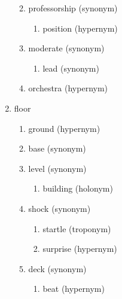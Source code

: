 \documentclass[11pt,a4paper,twocolumn]{article}
\begin{document}
\begin{enumerate}
\begin{enumerate}
\begin{enumerate}
						\end{enumerate}
					\item professorship (synonym)
						\begin{enumerate}
							\item position (hypernym)
							
						\end{enumerate}
						
					\item moderate (synonym)
						\begin{enumerate}
							\item lead (synonym)
						\end{enumerate}
					
					\item orchestra (hypernym)
				
				\end{enumerate}
			
			\item floor 
				\begin{enumerate}
				
					\item ground (hypernym)
					
					\item base (synonym)
					
					\item level (synonym)
						\begin{enumerate}
							\item building (holonym)
						\end{enumerate}
					
					\item shock (synonym)
					
						\begin{enumerate}
							
							\item startle (troponym)
							
							\item surprise (hypernym)							
								
						\end{enumerate}											
					
					\item deck (synonym)		
						\begin{enumerate}
							\item beat (hypernym)
						\end{enumerate}
				\end{enumerate}		
				

\end{enumerate}
\end{document}
